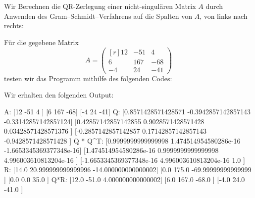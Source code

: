 \section{}

Wir Berechnen die QR-Zerlegung einer nicht-singulären Matrix $A$ durch Anwenden des Gram--Schmidt--Verfahrens auf die Spalten von $A$, von links nach rechts:



Für die gegebene Matrix
\[
    A
  = \begin{pmatrix*}[r]
      12 & -51  &   4 \\
       6 &  167 & -68 \\
      -4 &  24  & -41
    \end{pmatrix*}
\]
testen wir das Programm mithilfe des folgenden Codes:
  


Wir erhalten den folgenden Output:

\begin{consoleoutput}
A:
[12 -51 4  ]
[6  167 -68]
[-4 24  -41]
Q:
[0.8571428571428571  -0.3942857142857143 -0.33142857142857124]
[0.42857142857142855 0.9028571428571428  0.03428571428571376 ]
[-0.2857142857142857 0.17142857142857143 -0.9428571428571428 ]
Q * Q^T:
[0.9999999999999998      1.474514954580286e-16 -1.6653345369377348e-16]
[1.474514954580286e-16   0.9999999999999998    4.996003610813204e-16  ]
[-1.6653345369377348e-16 4.996003610813204e-16 1.0                    ]
R:
[14.0 20.999999999999996 -14.000000000000002]
[0.0  175.0              -69.99999999999999 ]
[0.0  0.0                35.0               ]
Q*R:
[12.0 -51.0 4.000000000000002]
[6.0  167.0 -68.0            ]
[-4.0 24.0  -41.0            ]
\end{consoleoutput}

